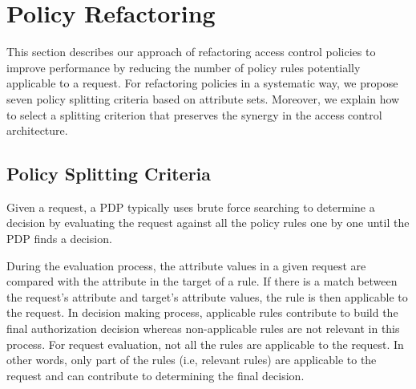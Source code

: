 \section{Policy Refactoring} \label{sec:approach}
This section describes our approach of refactoring access control policies to improve performance by reducing the number of policy 
rules potentially applicable to a request. For refactoring policies in a systematic way, we propose seven policy splitting 
criteria based on attribute sets. 
Moreover, we explain how to select a splitting criterion that preserves the synergy in the access control architecture.

\subsection{Policy Splitting Criteria} \label{subsec:SplittingCriteria}
Given a request, a PDP typically uses brute force searching to determine a decision by evaluating the request against all the policy rules 
one by one until the PDP finds a decision.

During the evaluation process, the attribute values in a given request are compared with the attribute in the target of a rule. 
If there is a match between the request's attribute and target's attribute values, the rule is then applicable to the request.
In decision making process, applicable rules contribute
to build the final authorization decision whereas non-applicable rules are not relevant in this process. 
For request evaluation, not all the rules are applicable to the request. In other words, only part of the rules (i.e, relevant rules) are
 applicable to the request and can contribute to determining the final decision.

